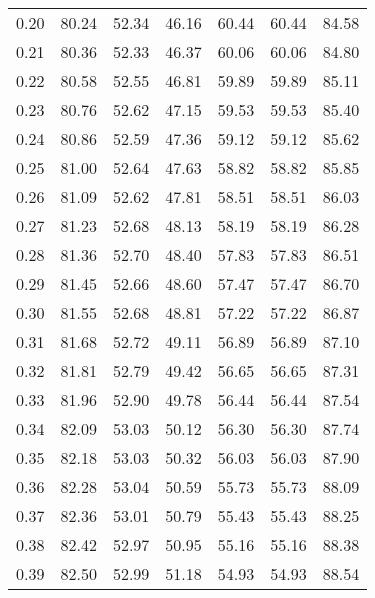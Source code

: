 \begin{tabular}{|c|c|c|c|c|c|c|}
      0.20 &     80.24 &     52.34 &      46.16 &   60.44 &      60.44 &         84.58 \\
      0.21 &     80.36 &     52.33 &      46.37 &   60.06 &      60.06 &         84.80 \\
      0.22 &     80.58 &     52.55 &      46.81 &   59.89 &      59.89 &         85.11 \\
      0.23 &     80.76 &     52.62 &      47.15 &   59.53 &      59.53 &         85.40 \\
      0.24 &     80.86 &     52.59 &      47.36 &   59.12 &      59.12 &         85.62 \\
      0.25 &     81.00 &     52.64 &      47.63 &   58.82 &      58.82 &         85.85 \\
      0.26 &     81.09 &     52.62 &      47.81 &   58.51 &      58.51 &         86.03 \\
      0.27 &     81.23 &     52.68 &      48.13 &   58.19 &      58.19 &         86.28 \\
      0.28 &     81.36 &     52.70 &      48.40 &   57.83 &      57.83 &         86.51 \\
      0.29 &     81.45 &     52.66 &      48.60 &   57.47 &      57.47 &         86.70 \\
      0.30 &     81.55 &     52.68 &      48.81 &   57.22 &      57.22 &         86.87 \\
      0.31 &     81.68 &     52.72 &      49.11 &   56.89 &      56.89 &         87.10 \\
      0.32 &     81.81 &     52.79 &      49.42 &   56.65 &      56.65 &         87.31 \\
      0.33 &     81.96 &     52.90 &      49.78 &   56.44 &      56.44 &         87.54 \\
      0.34 &     82.09 &     53.03 &      50.12 &   56.30 &      56.30 &         87.74 \\
      0.35 &     82.18 &     53.03 &      50.32 &   56.03 &      56.03 &         87.90 \\
      0.36 &     82.28 &     53.04 &      50.59 &   55.73 &      55.73 &         88.09 \\
      0.37 &     82.36 &     53.01 &      50.79 &   55.43 &      55.43 &         88.25 \\
      0.38 &     82.42 &     52.97 &      50.95 &   55.16 &      55.16 &         88.38 \\
      0.39 &     82.50 &     52.99 &      51.18 &   54.93 &      54.93 &         88.54 \\

\end{tabular}
